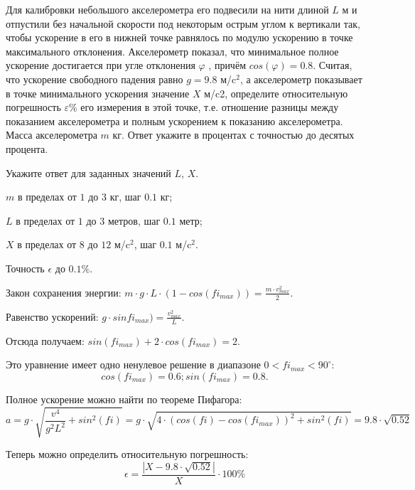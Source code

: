 
Для калибровки небольшого акселерометра его подвесили на нити длиной $L$ м и отпустили без начальной
скорости под некоторым острым углом к вертикали так, чтобы ускорение в его в
нижней точке равнялось по модулю ускорению в точке максимального отклонения.
Акселерометр показал, что минимальное полное ускорение достигается при угле
отклонения $\varphi$ , причём $cos(\varphi) = 0.8$. Считая, что
ускорение свободного падения равно $g = 9.8$  м/c$^2$, а акселерометр показывает в точке минимального
ускорения значение $X$  м/c2, определите относительную
погрешность $\varepsilon\%$  его измерения в этой
точке, т.е. отношение разницы между показанием акселерометра и 
полным ускорением к показанию акселерометра. Масса акселерометра $m$  кг. Ответ укажите в процентах с точностью до десятых
процента.

Укажите ответ для заданных значений $L$, $X$.

\paramSection

$m$ в пределах от $1$ до $3$ кг, шаг $0.1$ кг;  

$L$ в пределах от $1$ до $3$ метров, шаг $0.1$ метр;

$X$ в пределах от $8$ до $12$ м/c$^2$,  шаг $0.1$ м/c$^2$. 

Точность $\epsilon$ до $0.1 \%$.

\solutionSection

Закон сохранения энергии: $m \cdot g \cdot L \cdot (1-cos(fi_{max} ) )=\frac{m \cdot v_{max}^2}{2}.$

Равенство ускорений: $g \cdot sinfi_{max})=\frac{v_{max}^2}{L}.$

Отсюда получаем: $sin(fi_{max})+2 \cdot cos(fi_{max} )=2.$

Это уравнение имеет одно ненулевое решение в диапазоне $0 < fi_{max} < 90^{\circ}$:
 $$cos(fi_{max})=0.6;  sin(fi_{max} )=0.8.$$

Полное ускорение можно найти по теореме Пифагора:
$$a=g \cdot \sqrt{\frac{v^4}{g^2 L^2} +sin^2(fi)}=g \cdot \sqrt{4 \cdot (cos(fi)-cos(fi_{max}))^2+sin^2(fi)}= 9.8 \cdot \sqrt{0.52}$$

Теперь можно определить относительную погрешность:
$$\epsilon =\frac{|X-9.8 \cdot \sqrt{0.52}|}{X} \cdot 100 \% $$



